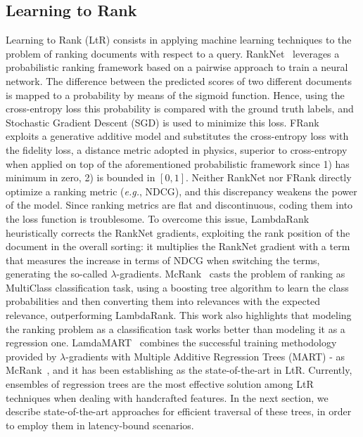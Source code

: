 \subsection{Learning to Rank}
\label{subsec:ltr}
Learning to Rank (LtR) consists in applying machine learning techniques to the problem of ranking documents with respect to a query.
RankNet~\cite{burges2005learning} leverages a  probabilistic ranking framework based on a pairwise approach to train a neural network. The difference between the predicted scores of two different documents is mapped to a probability by means of the sigmoid function. Hence, using the cross-entropy loss this probability is compared with the ground truth labels, and Stochastic Gradient Descent (SGD) is used to minimize this loss. FRank~\cite{tsai2007frank} exploits a generative additive model and substitutes the cross-entropy loss with the fidelity loss, a distance metric adopted in physics, superior to cross-entropy when applied on top of the aforementioned probabilistic framework since 1) has minimum in zero, 2) is bounded in $[0,1]$. 
Neither RankNet nor FRank directly optimize a ranking metric (\emph{e.g.}, NDCG), and this discrepancy weakens the power of the model. Since ranking metrics are flat and discontinuous, coding them into the loss function is troublesome.
To overcome this issue, LambdaRank~\cite{burges2007learning} heuristically corrects the RankNet gradients, exploiting the rank position of the document in the overall sorting: it multiplies the RankNet gradient with a term that measures the increase in terms of NDCG when switching the terms, generating the so-called $\lambda$-gradients.
McRank~\cite{li2008mcrank} casts the problem of ranking as MultiClass classification task, using a boosting tree algorithm to learn the class probabilities and then converting them into relevances with the expected relevance, outperforming LambdaRank.  This work also highlights that modeling the ranking problem as a classification task works better than modeling it as a regression one.  
LamdaMART~\cite{burges2010ranknet} combines the successful training methodology provided by $\lambda$-gradients with Multiple Additive Regression Trees (MART) - as McRank~\cite{li2008mcrank}, and it has been establishing as the state-of-the-art in LtR. Currently, ensembles of regression trees are the most effective solution among LtR techniques when dealing with handcrafted features. In the next section, we describe state-of-the-art approaches for efficient traversal of these trees, in order to employ them in latency-bound scenarios.


